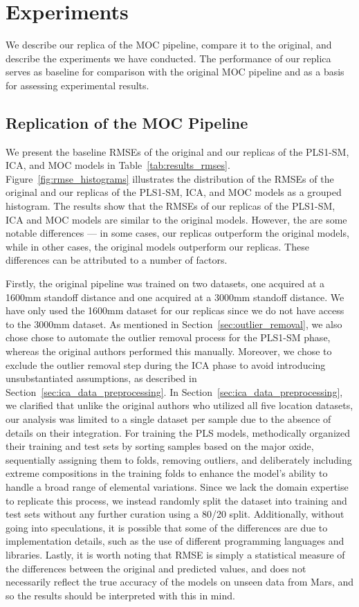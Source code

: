 \section{Experiments}\label{sec:experiments}
We describe our replica of the MOC pipeline, compare it to the original, and describe the experiments we have conducted.
The performance of our replica serves as baseline for comparison with the original MOC pipeline and as a basis for assessing experimental results.

\subsection{Replication of the MOC Pipeline}\label{sec:replica_moc}
We present the baseline RMSEs of the original and our replicas of the PLS1-SM, ICA, and MOC models in Table~\ref{tab:results_rmses}.
Figure~\ref{fig:rmse_histograms} illustrates the distribution of the RMSEs of the original and our replicas of the PLS1-SM, ICA, and MOC models as a grouped histogram.
The results show that the RMSEs of our replicas of the PLS1-SM, ICA and MOC models are similar to the original models.
However, the are some notable differences --- in some cases, our replicas outperform the original models, while in other cases, the original models outperform our replicas.
These differences can be attributed to a number of factors.

Firstly, the original pipeline was trained on two datasets, one acquired at a 1600mm standoff distance and one acquired at a 3000mm standoff distance.
We have only used the 1600mm dataset for our replicas since we do not have access to the 3000mm dataset.
As mentioned in Section~\ref{sec:outlier_removal}, we also chose chose to automate the outlier removal process for the PLS1-SM phase, whereas the original authors performed this manually.
Moreover, we chose to exclude the outlier removal step during the ICA phase to avoid introducing unsubstantiated assumptions, as described in Section~\ref{sec:ica_data_preprocessing}.
In Section~\ref{sec:ica_data_preprocessing}, we clarified that unlike the original authors who utilized all five location datasets, our analysis was limited to a single dataset per sample due to the absence of details on their integration.
For training the PLS models, \citet{andersonImprovedAccuracyQuantitative2017} methodically organized their training and test sets by sorting samples based on the major oxide, sequentially assigning them to folds, removing outliers, and deliberately including extreme compositions in the training folds to enhance the model's ability to handle a broad range of elemental variations.
Since we lack the domain expertise to replicate this process, we instead randomly split the dataset into training and test sets without any further curation using a 80/20 split.
Additionally, without going into speculations, it is possible that some of the differences are due to implementation details, such as the use of different programming languages and libraries.
Lastly, it is worth noting that RMSE is simply a statistical measure of the differences between the original and predicted values, and does not necessarily reflect the true accuracy of the models on unseen data from Mars, and so the results should be interpreted with this in mind.

